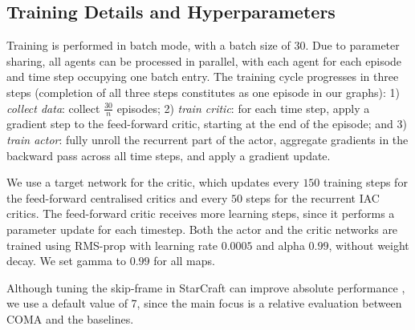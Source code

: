 \documentclass[letterpaper]{article}
\newcommand{\citep}{\cite}
\begin{document}
\subsection*{Training Details and Hyperparameters}
Training is performed in batch mode, with a batch size of 30. Due to parameter 
sharing,  all agents can be processed in parallel, with each agent for each 
episode and time step occupying one batch entry. The training cycle progresses 
in three steps (completion of all three steps constitutes as one episode in our 
graphs):
1) \emph{collect data}: collect $\frac{30}{n}$ episodes;
2) \emph{train critic}: for each time step, apply a gradient step to the 
feed-forward critic, starting at the end of the episode; and
3) \emph{train actor}: fully unroll the recurrent part of the actor, aggregate 
gradients in the backward pass across all time steps, and apply a gradient 
update. 

We use a target network for the critic, which updates every $150$ training 
steps for the feed-forward centralised critics and every $50$ steps for the 
recurrent IAC critics. The feed-forward critic receives more learning steps, 
since it performs a parameter update for each timestep. Both the actor and the 
critic networks are trained using RMS-prop with learning rate $0.0005$ and 
alpha $0.99$, without weight decay.  We set gamma to $0.99$ for all maps.

Although tuning the skip-frame in StarCraft can improve absolute 
performance \citep{peng2017multiagent}, we use a default value of 7, since the 
main focus is a relative evaluation between COMA and the baselines.
\end{document}
